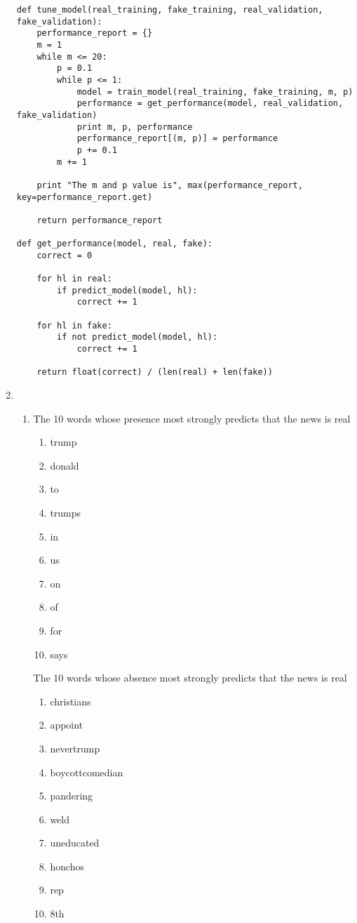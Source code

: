 \documentclass[10pt,letterpaper]{article}
\begin{document}
\begin{enumerate}
\begin{lstlisting}
def tune_model(real_training, fake_training, real_validation, fake_validation):
    performance_report = {}
    m = 1
    while m <= 20:
        p = 0.1
        while p <= 1:
            model = train_model(real_training, fake_training, m, p)
            performance = get_performance(model, real_validation, fake_validation)
            print m, p, performance
            performance_report[(m, p)] = performance
            p += 0.1
        m += 1

    print "The m and p value is", max(performance_report, key=performance_report.get)

    return performance_report

def get_performance(model, real, fake):
    correct = 0

    for hl in real:
        if predict_model(model, hl):
            correct += 1

    for hl in fake:
        if not predict_model(model, hl):
            correct += 1

    return float(correct) / (len(real) + len(fake))
		\end{lstlisting}
		\item %
		\begin{enumerate}
			\item %
			The 10 words whose presence most strongly predicts that the news is real
			\begin{enumerate}
				\item trump
				\item donald
				\item to
				\item trumps
				\item in
				\item us
				\item on
				\item of
				\item for
				\item says
			\end{enumerate}
		
			The 10 words whose absence most strongly predicts that the news is real
			\begin{enumerate}
				\item christians
				\item appoint
				\item nevertrump
				\item boycottcomedian
				\item pandering
				\item weld
				\item uneducated
				\item honchos
				\item rep
				\item 8th
			\end{enumerate}
		

\end{enumerate}
\end{enumerate}
\end{document}
